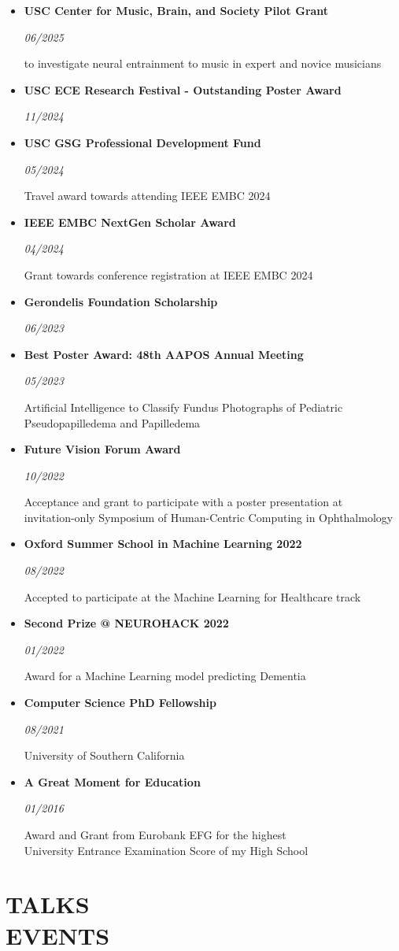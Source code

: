 \documentclass[margin]{res}
\newcommand{\cvheading}[2]{%
  \par\Needspace{4\baselineskip}\noindent
  \parbox[t]{\dimexpr\linewidth-110pt\relax}{\raggedright\bfseries #1}%
  \hfill\parbox[t]{98pt}{\raggedleft\itshape #2}%
  \par\nopagebreak[4]\vspace{-\parskip}\noindent\ignorespaces}
\begin{document}
\begin{resume}
\begin{itemize}[leftmargin=*]
    \item[\ding{73}] \cvheading{USC Center for Music, Brain, and Society Pilot Grant}{06/2025} to investigate neural entrainment to music in expert and novice musicians
    \item[\ding{73}] \cvheading{USC ECE Research Festival - Outstanding Poster Award}{11/2024}
    \item[\ding{73}] \cvheading{USC GSG Professional Development Fund}{05/2024} Travel award towards attending IEEE EMBC 2024
    \item[\ding{73}] \cvheading{IEEE EMBC NextGen Scholar Award}{04/2024} Grant towards conference registration at IEEE EMBC 2024
    \item[\ding{73}] \cvheading{Gerondelis Foundation Scholarship}{06/2023}
    \item[\ding{73}] \cvheading{Best Poster Award: 48th AAPOS Annual Meeting}{05/2023} Artificial Intelligence to Classify Fundus Photographs of Pediatric Pseudopapilledema and Papilledema
    \item[\ding{73}] \cvheading{Future Vision Forum Award}{10/2022} Acceptance and grant to participate with a poster presentation at \\ invitation-only Symposium of Human-Centric Computing in Ophthalmology
    \item[\ding{73}] \cvheading{Oxford Summer School in Machine Learning 2022}{08/2022} Accepted to participate at the Machine Learning for Healthcare track
    \item[\ding{73}] \cvheading{Second Prize @ NEUROHACK 2022}{01/2022} Award for a Machine Learning model predicting Dementia
    \item[\ding{73}] \cvheading{Computer Science PhD Fellowship}{08/2021} University of Southern California
    \item[\ding{73}] \cvheading{A Great Moment for Education}{01/2016} Award and Grant from Eurobank EFG for the highest \\ University Entrance Examination Score of my High School
\end{itemize}

\section{TALKS \\ EVENTS}


\end{resume}
\end{document}
